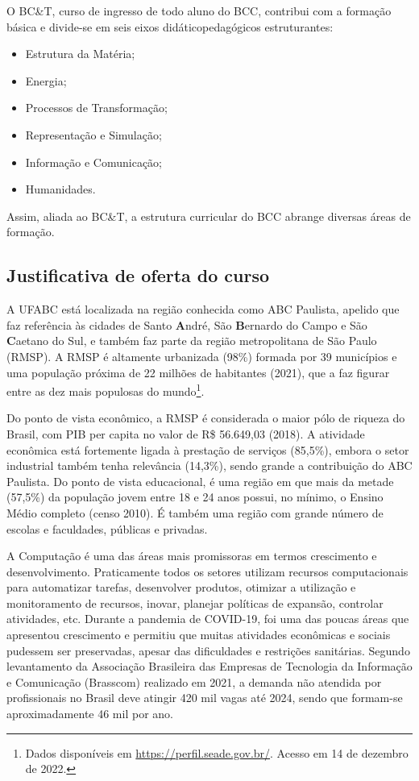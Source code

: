 O BC\&T, curso de ingresso de todo aluno do BCC, contribui com a formação
básica e divide-se em seis eixos didáticopedagógicos estruturantes:
\begin{itemize}
    \item Estrutura da Matéria;
    \item Energia;
    \item Processos de Transformação;
    \item Representação e Simulação;
    \item Informação e Comunicação;
    \item Humanidades.
\end{itemize}
Assim, aliada ao BC\&T, a estrutura curricular do BCC abrange diversas áreas de
formação.


\subsection{Justificativa de oferta do curso}

A UFABC está localizada na região conhecida como ABC Paulista, apelido que faz
referência às cidades de Santo \textbf{A}ndré, São \textbf{B}ernardo do Campo e
São \textbf{C}aetano do Sul, e também faz parte da região metropolitana de São
Paulo (RMSP).
A RMSP é altamente urbanizada (98\%) formada por 39 municípios e uma população
próxima de 22 milhões de habitantes (2021), que a faz figurar entre as dez mais
populosas do mundo\footnote{Dados disponíveis em
\url{https://perfil.seade.gov.br/}. Acesso em 14 de dezembro de 2022.}. 

Do ponto de vista econômico, a RMSP é considerada o maior pólo de riqueza do
Brasil, com PIB per capita no valor de R\$ 56.649,03 (2018).
A atividade econômica está fortemente ligada à prestação de serviços (85,5\%),
embora o setor industrial também tenha relevância (14,3\%), sendo grande a
contribuição do ABC Paulista. 
Do ponto de vista educacional, é uma região em que mais da metade (57,5\%) da
população jovem entre 18 e 24 anos possui, no mínimo, o Ensino Médio completo
(censo 2010).
É também uma região com grande número de escolas e faculdades, públicas e
privadas. 

A Computação é uma das áreas mais promissoras em termos crescimento e
desenvolvimento.
Praticamente todos os setores utilizam recursos computacionais para automatizar
tarefas, desenvolver produtos, otimizar a utilização e monitoramento de
recursos, inovar, planejar políticas de expansão, controlar atividades, etc.
Durante a pandemia de COVID-19, foi uma das poucas áreas que apresentou
crescimento e permitiu que muitas atividades econômicas e sociais pudessem ser
preservadas, apesar das dificuldades e restrições sanitárias.
Segundo levantamento da Associação Brasileira das Empresas de Tecnologia da
Informação e Comunicação (Brasscom) realizado em 2021, a demanda não atendida
por profissionais no Brasil deve atingir 420 mil vagas até 2024, sendo que
formam-se aproximadamente 46 mil por ano.

